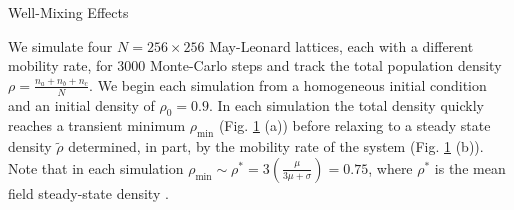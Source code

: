 \documentclass{beamer}
\begin{document}
\begin{frame}{}
\begin{textblock}{0.32}
\begin{block}{\centering Well-Mixing Effects}
\begin{figure}[h]
            \label{fig:popDens}
        \end{figure}
        We simulate four $ N = 256 \times 256 $ May-Leonard lattices, each with a
        different mobility rate, for 3000 Monte-Carlo steps and track the total 
        population density $ \rho = \frac{n_a + n_b + n_c}{N} $. We begin each 
        simulation from a homogeneous initial condition and an initial density 
        of $ \rho_0 = 0.9 $. In each simulation the total density quickly reaches
        a transient minimum $ \rho_\mathrm{min} $ (Fig. \ref{fig:popDens} (a))
        before relaxing to a steady state density $ \tilde\rho $ determined, in 
        part, by the mobility rate of the system (Fig. \ref{fig:popDens} (b)). Note that in each simulation 
        $ \rho_\mathrm{min} \sim \rho^* = 3 \left( \frac{\mu}{3\mu + 
        \sigma}\right) = 0.75$, where $ \rho^* $ is the mean field steady-state
        density \cite{he2011}.
    \end{block}


\end{textblock}
\end{frame}
\end{document}
